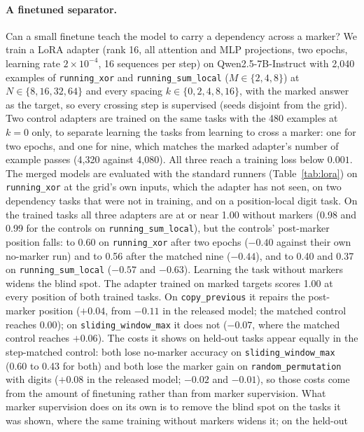 \documentclass[10pt]{article} %
\newcommand{\task}[1]{\texttt{#1}}
\begin{document}
\begin{table}[!htbp]
\centering
\small
\caption{Base against instruction-tuned checkpoints of Qwen2.5-7B and Qwen2.5-32B under one prompt (no chat template, three solved examples; $N \in \{16, 32, 64\}$, $k \in \{2, 4, 8, 16\}$ against $k = 0$, 20 trials per cell). Digits: mean over the three digit tasks; Dependency: mean over the four dependency tasks. $\Delta$ is the length-matched pooled effect; per-position changes are against the no-marker run at the same positions.}
\label{tab:base}

\end{table}

\paragraph{A finetuned separator.} Can a small finetune teach the model to carry a dependency across a marker? We train a LoRA adapter (rank 16, all attention and MLP projections, two epochs, learning rate $2 \times 10^{-4}$, 16 sequences per step) on Qwen2.5-7B-Instruct with 2{,}040 examples of \task{running\_xor} and \task{running\_sum\_local} ($M \in \{2, 4, 8\}$) at $N \in \{8, 16, 32, 64\}$ and every spacing $k \in \{0, 2, 4, 8, 16\}$, with the marked answer as the target, so every crossing step is supervised (seeds disjoint from the grid). Two control adapters are trained on the same tasks with the 480 examples at $k = 0$ only, to separate learning the tasks from learning to cross a marker: one for two epochs, and one for nine, which matches the marked adapter's number of example passes (4{,}320 against 4{,}080). All three reach a training loss below $0.001$. The merged models are evaluated with the standard runners (Table~\ref{tab:lora}) on \task{running\_xor} at the grid's own inputs, which the adapter has not seen, on two dependency tasks that were not in training, and on a position-local digit task. On the trained tasks all three adapters are at or near 1.00 without markers (0.98 and 0.99 for the controls on \task{running\_sum\_local}), but the controls' post-marker position falls: to 0.60 on \task{running\_xor} after two epochs ($-0.40$ against their own no-marker run) and to 0.56 after the matched nine ($-0.44$), and to 0.40 and 0.37 on \task{running\_sum\_local} ($-0.57$ and $-0.63$). Learning the task without markers widens the blind spot. The adapter trained on marked targets scores 1.00 at every position of both trained tasks. On \task{copy\_previous} it repairs the post-marker position ($+0.04$, from $-0.11$ in the released model; the matched control reaches $0.00$); on \task{sliding\_window\_max} it does not ($-0.07$, where the matched control reaches $+0.06$). The costs it shows on held-out tasks appear equally in the step-matched control: both lose no-marker accuracy on \task{sliding\_window\_max} (0.60 to 0.43 for both) and both lose the marker gain on \task{random\_permutation} with digits ($+0.08$ in the released model; $-0.02$ and $-0.01$), so those costs come from the amount of finetuning rather than from marker supervision. What marker supervision does on its own is to remove the blind spot on the tasks it was shown, where the same training without markers widens it; on the held-out 
\end{document}

